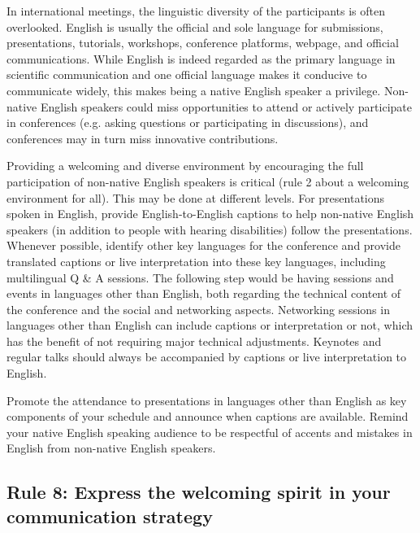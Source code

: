 \documentclass[10pt,letterpaper]{article}
\begin{document}
In international meetings, the linguistic diversity of the participants is often overlooked. 
English is usually the official and sole language for submissions, presentations, tutorials, workshops, conference platforms, webpage, and official communications. 
While English is indeed regarded as the primary language in scientific communication and one official language makes it conducive to communicate widely, this makes being a native English speaker a privilege.
Non-native English speakers could miss opportunities to attend or actively participate in conferences (e.g. asking questions or participating in discussions),
and conferences may in turn miss innovative contributions.


Providing a welcoming and diverse environment by encouraging the full participation of non-native English speakers is critical (rule 2 about a welcoming environment for all). This may be done at different levels. 
For presentations spoken in English, provide English-to-English captions to help non-native English speakers (in addition to people with hearing disabilities) follow the presentations. Whenever possible, identify other key languages for the conference and provide translated captions or live interpretation into these key languages, including multilingual Q \& A sessions.
The following step would be having sessions and events in languages other than English, both regarding the technical content of the conference and the social and networking aspects. Networking sessions in languages other than English can include captions or interpretation or not, which has the benefit of not requiring major technical adjustments. Keynotes and regular talks should always be accompanied by captions or live interpretation to English.

Promote the attendance to presentations in languages other than English as key components of your schedule and announce when captions are available. 
Remind your native English speaking audience to be respectful of accents and mistakes in English from non-native English speakers. 




\subsection*{Rule 8: Express the welcoming spirit in your communication strategy}
\label{rule_communication}
\end{document}
